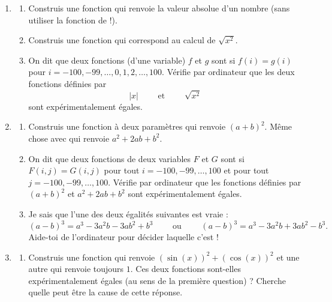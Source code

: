 \documentclass[11pt,class=report,crop=false]{standalone}
\begin{document}
\begin{activite}


\begin{enumerate}
  \item
  \begin{enumerate}
    \item Construis une fonction  qui renvoie la valeur absolue d'un nombre (sans utiliser la fonction  de \Python{} !). 
    \item Construis une fonction  qui correspond au calcul de $\sqrt{x^2}$.

  
  \item On dit que deux fonctions (d'une variable) $f$ et $g$ sont  si $f(i)=g(i)$ pour $i=-100,-99,\ldots,0,1,2,\ldots,100$. Vérifie par ordinateur que les deux fonctions définies par
  $$|x| \qquad \text{ et } \qquad \sqrt{x^2}$$
  sont expérimentalement égales. 
  
  \end{enumerate}
  
  \item
    \begin{enumerate}
    \item Construis une fonction à deux paramètres  qui renvoie $(a+b)^2$. Même chose avec  qui renvoie $a^2+2ab+b^2$.

  
  \item On dit que deux fonctions de deux variables $F$ et $G$ sont  si $F(i,j)=G(i,j)$ pour tout $i=-100,-99,\ldots,100$ et pour tout $j = -100,-99,\ldots,100$. Vérifie par ordinateur que les fonctions définies par $(a+b)^2$ et $a^2+2ab+b^2$ sont expérimentalement égales. 
  
   \item Je sais que l'une des deux égalités suivantes est vraie :
   $$(a-b)^3 = a^3 - 3a^2b -3ab^2+b^3 \qquad \text{ ou } \qquad (a-b)^3 = a^3 - 3a^2b  + 3ab^2 - b^3.$$
   Aide-toi de l'ordinateur pour décider laquelle c'est !
   
  \end{enumerate} 
  
  \item 
   \begin{enumerate}
    \item Construis une fonction  qui renvoie $(\sin(x))^2 + (\cos(x))^2$ et une autre  qui renvoie toujours $1$. Ces deux fonctions sont-elles expérimentalement égales (au sens de la première question) ? Cherche quelle peut être la cause de cette réponse.
    

\end{enumerate}
\end{enumerate}
\end{activite}
\end{document}

